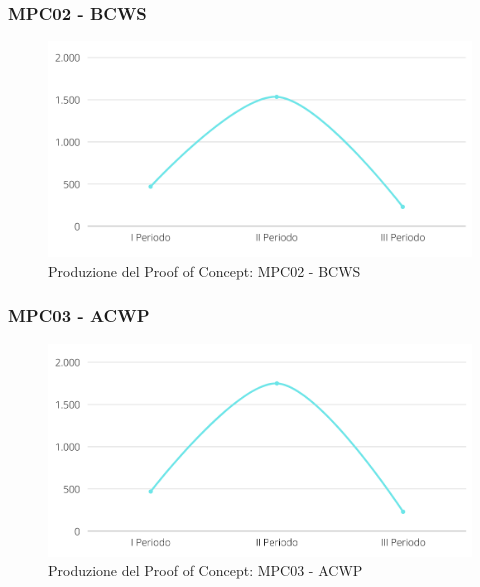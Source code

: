\subsubsection{MPC02 - BCWS}
\begin{figure}[H]
    \centering
    \includegraphics[scale=0.50]{Sezioni/images/poc-bcws.png}
    \caption{Produzione del Proof of Concept: MPC02 - BCWS}
\end{figure}

\subsubsection{MPC03 - ACWP}
\begin{figure}[H]
    \centering
    \includegraphics[scale=0.50]{Sezioni/images/poc-acwp.png}
    \caption{Produzione del Proof of Concept: MPC03 - ACWP}
\end{figure}

